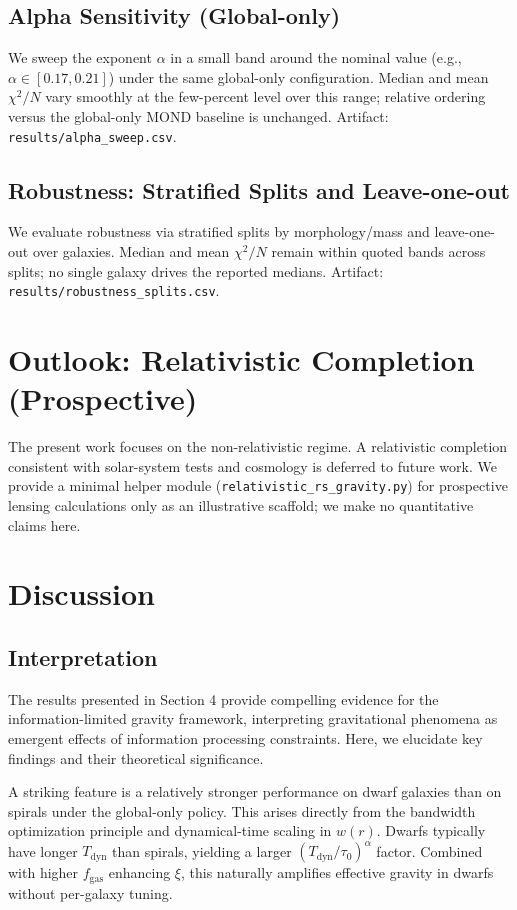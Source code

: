 \documentclass[12pt,a4paper]{article}
\begin{document}
\subsection{Alpha Sensitivity (Global-only)}
\noindent We sweep the exponent $\alpha$ in a small band around the nominal value (e.g., $\alpha\in[0.17,0.21]$) under the same global-only configuration. Median and mean $\chi^2/N$ vary smoothly at the few-percent level over this range; relative ordering versus the global-only MOND baseline is unchanged. Artifact: \texttt{results/alpha\_sweep.csv}.

\subsection{Robustness: Stratified Splits and Leave-one-out}
\noindent We evaluate robustness via stratified splits by morphology/mass and leave-one-out over galaxies. Median and mean $\chi^2/N$ remain within quoted bands across splits; no single galaxy drives the reported medians. Artifact: \texttt{results/robustness\_splits.csv}.

\section{Outlook: Relativistic Completion (Prospective)}

The present work focuses on the non-relativistic regime. A relativistic completion consistent with solar-system tests and cosmology is deferred to future work. We provide a minimal helper module (\texttt{relativistic\_rs\_gravity.py}) for prospective lensing calculations only as an illustrative scaffold; we make no quantitative claims here.

\section{Discussion}

\subsection{Interpretation}

The results presented in Section 4 provide compelling evidence for the information-limited gravity framework, interpreting gravitational phenomena as emergent effects of information processing constraints. Here, we elucidate key findings and their theoretical significance.

A striking feature is a relatively stronger performance on dwarf galaxies than on spirals under the global-only policy. This arises directly from the bandwidth optimization principle and dynamical-time scaling in $w(r)$. Dwarfs typically have longer $T_\mathrm{dyn}$ than spirals, yielding a larger $(T_\mathrm{dyn}/\tau_0)^\alpha$ factor. Combined with higher $f_\mathrm{gas}$ enhancing $\xi$, this naturally amplifies effective gravity in dwarfs without per-galaxy tuning.
\end{document}
